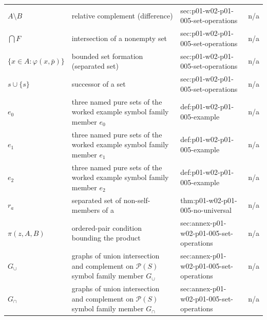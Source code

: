 \begin{longtable}{@{}p{}p{}p{}p{}@{}}
\(A\setminus B\) & relative complement (difference) & sec:\allowbreak{}p01-\allowbreak{}w02-\allowbreak{}p01-\allowbreak{}005-\allowbreak{}set-\allowbreak{}operations & n/a \\
\(\bigcap F\) & intersection of a nonempty set & sec:\allowbreak{}p01-\allowbreak{}w02-\allowbreak{}p01-\allowbreak{}005-\allowbreak{}set-\allowbreak{}operations & n/a \\
\(\{x\in A:\varphi(x,\allowbreak \bar p)\}\) & bounded set formation (separated set) & sec:\allowbreak{}p01-\allowbreak{}w02-\allowbreak{}p01-\allowbreak{}005-\allowbreak{}set-\allowbreak{}operations & n/a \\
\(s\cup\{s\}\) & successor of a set & sec:\allowbreak{}p01-\allowbreak{}w02-\allowbreak{}p01-\allowbreak{}005-\allowbreak{}set-\allowbreak{}operations & n/a \\
\(e_0\) & three named pure sets of the worked example symbol family member \(e_0\) & def:\allowbreak{}p01-\allowbreak{}w02-\allowbreak{}p01-\allowbreak{}005-\allowbreak{}example & n/a \\
\(e_1\) & three named pure sets of the worked example symbol family member \(e_1\) & def:\allowbreak{}p01-\allowbreak{}w02-\allowbreak{}p01-\allowbreak{}005-\allowbreak{}example & n/a \\
\(e_2\) & three named pure sets of the worked example symbol family member \(e_2\) & def:\allowbreak{}p01-\allowbreak{}w02-\allowbreak{}p01-\allowbreak{}005-\allowbreak{}example & n/a \\
\(r_a\) & separated set of non-self-members of a & thm:\allowbreak{}p01-\allowbreak{}w02-\allowbreak{}p01-\allowbreak{}005-\allowbreak{}no-\allowbreak{}universal & n/a \\
\(\pi(z,\allowbreak A,\allowbreak B)\) & ordered-pair condition bounding the product & sec:\allowbreak{}annex-\allowbreak{}p01-\allowbreak{}w02-\allowbreak{}p01-\allowbreak{}005-\allowbreak{}set-\allowbreak{}operations & n/a \\
\(G_{\cup}\) & graphs of union intersection and complement on \(\mathcal P(S)\) symbol family member \(G_{\cup}\) & sec:\allowbreak{}annex-\allowbreak{}p01-\allowbreak{}w02-\allowbreak{}p01-\allowbreak{}005-\allowbreak{}set-\allowbreak{}operations & n/a \\
\(G_{\cap}\) & graphs of union intersection and complement on \(\mathcal P(S)\) symbol family member \(G_{\cap}\) & sec:\allowbreak{}annex-\allowbreak{}p01-\allowbreak{}w02-\allowbreak{}p01-\allowbreak{}005-\allowbreak{}set-\allowbreak{}operations & n/a \\

\end{longtable}
